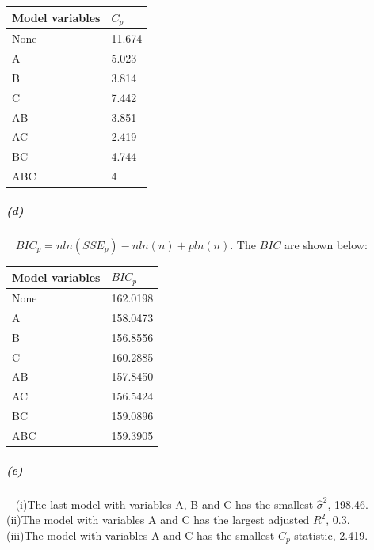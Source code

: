 \documentclass[12pt,a4paper]{article}
\begin{document}
\begin{center}
\begin{tabular}{|l|l|}
\hline
Model variables &  $C_p$ \\ \hline
None            & 11.674      \\ \hline
A               & 5.023        \\ \hline
B               & 3.814        \\ \hline
C               & 7.442      \\ \hline
AB              & 3.851     \\ \hline
AC              & 2.419     \\ \hline
BC              & 4.744     \\ \hline
ABC             & 4      \\ \hline
\end{tabular}
\end{center}
\subparagraph{(d)}~{}
$BIC_p = nln(SSE_p) - nln(n) + pln(n)$. The $BIC$ are shown below:\\
\begin{center}
\begin{tabular}{|l|l|}
\hline
Model variables &  $BIC_p$ \\ \hline
None            & 162.0198      \\ \hline
A               & 158.0473        \\ \hline
B               & 156.8556        \\ \hline
C               & 160.2885      \\ \hline
AB              & 157.8450      \\ \hline
AC              & 156.5424     \\ \hline
BC              & 159.0896      \\ \hline
ABC             & 159.3905      \\ \hline
\end{tabular}
\end{center}
\subparagraph{(e)}~{}
\newline
(i)The last model with variables A, B and C has the smallest $\hat{\sigma}^2$, 198.46.\\
\newline
(ii)The model with variables A and C has the largest adjusted $R^2$, 0.3.\\
\newline
(iii)The model with variables A and C has the smallest $C_p$ statistic, 2.419.\\
\newline
\end{document}
